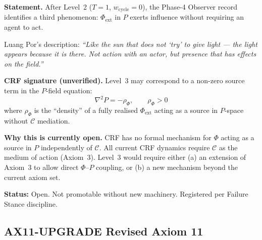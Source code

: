 \documentclass[12pt, a4paper]{article}
\providecommand{\Phiext}{\Phi_{\mathrm{ext}}}
\providecommand{\wcyc}{w_{\mathrm{cycle}}}
\begin{document}
\begin{openqbox}[title={GAP-AX11-01: Level 3 ---
  Presence Without Agent (Open)}]
\textbf{Statement.}
After Level~2 ($T = 1$, $\wcyc = 0$), the Phase-4 Observer
record identifies a third phenomenon: $\Phiext$ in $P$ exerts
influence without requiring an agent to act.

Luang Por's description:
\textit{``Like the sun that does not `try' to give light ---
the light appears because it is there. Not action with an actor,
but presence that has effects on the field.''}

\textbf{CRF signature (unverified).}
Level~3 may correspond to a non-zero source term in the
$P$-field equation:
\[
  \nabla^2 P = -\rho_\Phi, \qquad \rho_\Phi > 0
\]
where $\rho_\Phi$ is the ``density'' of a fully realised
$\Phiext$ acting as a source in $P$-space without
$\mathcal{C}$ mediation.

\textbf{Why this is currently open.}
CRF has no formal mechanism for $\Phi$ acting as a source in
$P$ independently of $\mathcal{C}$. All current CRF dynamics
require $\mathcal{C}$ as the medium of action (Axiom~3).
Level~3 would require either (a) an extension of Axiom~3 to
allow direct $\Phi$--$P$ coupling, or (b) a new mechanism
beyond the current axiom set.

\textbf{Status:} Open. Not promotable without new machinery.
Registered per Failure Stance discipline.
\end{openqbox}

\subsection{AX11-UPGRADE \quad Revised Axiom 11}

\end{document}
